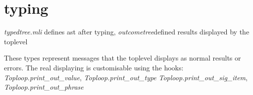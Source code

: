 \section{typing}

\textit{typedtree.mli} defines ast after typing,
\textit{outcometree}defined results displayed by the toplevel

These types represent messages that the toplevel displays as normal
results or errors. The real displaying is customisable using the
hooks: \textit{Toploop.print\_out\_value},
\textit{Toploop.print\_out\_type}
\textit{Toploop.print\_out\_sig\_item},
\textit{Toploop.print\_out\_phrase}
